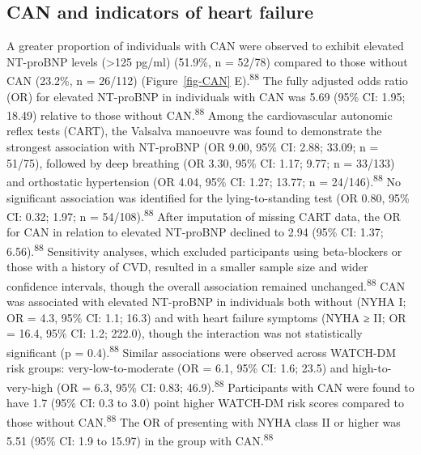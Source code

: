 \documentclass[
  a4paper,
  headsepline=true,
  open=any]{scrbook}
\begin{document}
\restoregeometry

\hypertarget{can-and-indicators-of-heart-failure}{%
\subsection{CAN and indicators of heart
failure}\label{can-and-indicators-of-heart-failure}}

A greater proportion of individuals with CAN were observed to exhibit
elevated NT-proBNP levels (\textgreater125 pg/ml) (51.9\%, n = 52/78)
compared to those without CAN (23.2\%, n = 26/112) (Figure~\ref{fig-CAN}
E).\textsuperscript{88} The fully adjusted odds ratio (OR) for elevated
NT-proBNP in individuals with CAN was 5.69 (95\% CI: 1.95; 18.49)
relative to those without CAN.\textsuperscript{88} Among the
cardiovascular autonomic reflex tests (CART), the Valsalva manoeuvre was
found to demonstrate the strongest association with NT-proBNP (OR 9.00,
95\% CI: 2.88; 33.09; n = 51/75), followed by deep breathing (OR 3.30,
95\% CI: 1.17; 9.77; n = 33/133) and orthostatic hypertension (OR 4.04,
95\% CI: 1.27; 13.77; n = 24/146).\textsuperscript{88} No significant
association was identified for the lying-to-standing test (OR 0.80, 95\%
CI: 0.32; 1.97; n = 54/108).\textsuperscript{88} After imputation of
missing CART data, the OR for CAN in relation to elevated NT-proBNP
declined to 2.94 (95\% CI: 1.37; 6.56).\textsuperscript{88} Sensitivity
analyses, which excluded participants using beta-blockers or those with
a history of CVD, resulted in a smaller sample size and wider confidence
intervals, though the overall association remained
unchanged.\textsuperscript{88} CAN was associated with elevated
NT-proBNP in individuals both without (NYHA I; OR = 4.3, 95\% CI: 1.1;
16.3) and with heart failure symptoms (NYHA ≥ II; OR = 16.4, 95\% CI:
1.2; 222.0), though the interaction was not statistically significant (p
= 0.4).\textsuperscript{88} Similar associations were observed across
WATCH-DM risk groups: very-low-to-moderate (OR = 6.1, 95\% CI: 1.6;
23.5) and high-to-very-high (OR = 6.3, 95\% CI: 0.83;
46.9).\textsuperscript{88} Participants with CAN were found to have 1.7
(95\% CI: 0.3 to 3.0) point higher WATCH-DM risk scores compared to
those without CAN.\textsuperscript{88} The OR of presenting with NYHA
class II or higher was 5.51 (95\% CI: 1.9 to 15.97) in the group with
CAN.\textsuperscript{88}

\end{document}
